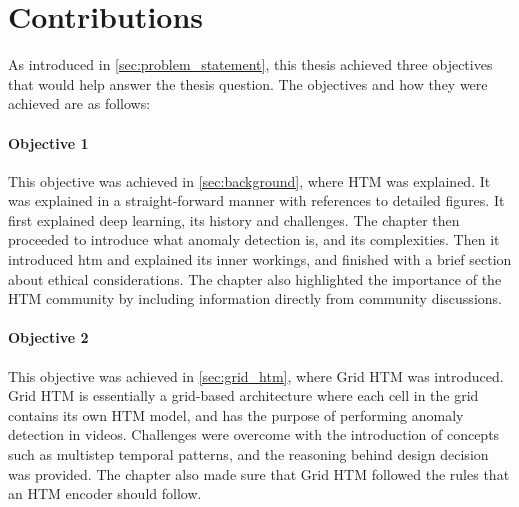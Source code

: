 \section{Contributions}
As introduced in \autoref{sec:problem_statement}, this thesis achieved three objectives that would help answer the thesis question. The objectives and how they were achieved are as follows:
\par
\paragraph*{Objective 1} \emph{}
\par
This objective was achieved in \autoref{sec:background}, where HTM was explained. It was explained in a straight-forward manner with references to detailed figures. It first explained deep learning, its history and challenges. The chapter then proceeded to introduce what anomaly detection is, and its complexities. Then it introduced \gls*{htm} and explained its inner workings, and finished with a brief section about ethical considerations. The chapter also highlighted the importance of the HTM community by including information directly from community discussions.
\paragraph*{Objective 2} \emph{}
\par
This objective was achieved in \autoref{sec:grid_htm}, where Grid HTM was introduced. Grid HTM is essentially a grid-based architecture where each cell in the grid contains its own HTM model, and has the purpose of performing anomaly detection in videos. Challenges were overcome with the introduction of concepts such as multistep temporal patterns, and the reasoning behind design decision was provided. The chapter also made sure that Grid HTM followed the rules that an HTM encoder should follow.
